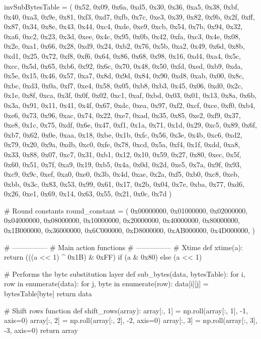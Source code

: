 \begin{python}
invSubBytesTable = (
    0x52, 0x09,	0x6a, 0xd5, 0x30, 0x36,	0xa5, 0x38,	0xbf, 0x40,	0xa3, 0x9e, 0x81, 0xf3, 0xd7, 0xfb,
    0x7c, 0xe3,	0x39, 0x82, 0x9b, 0x2f,	0xff, 0x87,	0x34, 0x8e,	0x43, 0x44, 0xc4, 0xde, 0xe9, 0xcb,
    0x54, 0x7b,	0x94, 0x32, 0xa6, 0xc2,	0x23, 0x3d,	0xee, 0x4c,	0x95, 0x0b, 0x42, 0xfa, 0xc3, 0x4e,
    0x08, 0x2e,	0xa1, 0x66, 0x28, 0xd9,	0x24, 0xb2,	0x76, 0x5b,	0xa2, 0x49, 0x6d, 0x8b, 0xd1, 0x25,
    0x72, 0xf8,	0xf6, 0x64, 0x86, 0x68,	0x98, 0x16,	0xd4, 0xa4,	0x5c, 0xcc, 0x5d, 0x65, 0xb6, 0x92,
    0x6c, 0x70,	0x48, 0x50, 0xfd, 0xed,	0xb9, 0xda,	0x5e, 0x15,	0x46, 0x57, 0xa7, 0x8d, 0x9d, 0x84,
    0x90, 0xd8,	0xab, 0x00, 0x8c, 0xbc,	0xd3, 0x0a,	0xf7, 0xe4,	0x58, 0x05, 0xb8, 0xb3, 0x45, 0x06,
    0xd0, 0x2c,	0x1e, 0x8f, 0xca, 0x3f,	0x0f, 0x02,	0xc1, 0xaf,	0xbd, 0x03, 0x01, 0x13, 0x8a, 0x6b,
    0x3a, 0x91,	0x11, 0x41, 0x4f, 0x67,	0xdc, 0xea,	0x97, 0xf2,	0xcf, 0xce, 0xf0, 0xb4, 0xe6, 0x73,
    0x96, 0xac,	0x74, 0x22, 0xe7, 0xad,	0x35, 0x85,	0xe2, 0xf9,	0x37, 0xe8, 0x1c, 0x75, 0xdf, 0x6e,
    0x47, 0xf1,	0x1a, 0x71, 0x1d, 0x29,	0xc5, 0x89,	0x6f, 0xb7,	0x62, 0x0e, 0xaa, 0x18, 0xbe, 0x1b,
    0xfc, 0x56,	0x3e, 0x4b, 0xc6, 0xd2,	0x79, 0x20,	0x9a, 0xdb,	0xc0, 0xfe, 0x78, 0xcd, 0x5a, 0xf4,
    0x1f, 0xdd,	0xa8, 0x33, 0x88, 0x07,	0xc7, 0x31,	0xb1, 0x12,	0x10, 0x59, 0x27, 0x80, 0xec, 0x5f,
    0x60, 0x51,	0x7f, 0xa9, 0x19, 0xb5,	0x4a, 0x0d,	0x2d, 0xe5,	0x7a, 0x9f, 0x93, 0xc9, 0x9c, 0xef,
    0xa0, 0xe0,	0x3b, 0x4d, 0xae, 0x2a,	0xf5, 0xb0,	0xc8, 0xeb,	0xbb, 0x3c, 0x83, 0x53, 0x99, 0x61,
    0x17, 0x2b,	0x04, 0x7e, 0xba, 0x77,	0xd6, 0x26,	0xe1, 0x69,	0x14, 0x63, 0x55, 0x21, 0x0c, 0x7d
    )

# Round constants
round_constant = (
    0x00000000, 0x01000000, 0x02000000,
    0x04000000, 0x08000000, 0x10000000,
    0x20000000, 0x40000000, 0x80000000,
    0x1B000000, 0x36000000, 0x6C000000,
    0xD8000000, 0xAB000000, 0x4D000000,
    )


# ---------------
# Main action functions
# ---------------
# Xtime
def xtime(a):
    return (((a << 1) ^ 0x1B) & 0xFF) if (a & 0x80) else (a << 1)


# Performs the byte substitution layer
def sub_bytes(data, bytesTable):
    for i, row in enumerate(data):
        for j, byte in enumerate(row):
            data[i][j] = bytesTable[byte]
    return data


# Shift rows function
def shift_rows(array):
    array[:, 1] = np.roll(array[:, 1], -1, axis=0)
    array[:, 2] = np.roll(array[:, 2], -2, axis=0)
    array[:, 3] = np.roll(array[:, 3], -3, axis=0)
    return array



\end{python}

